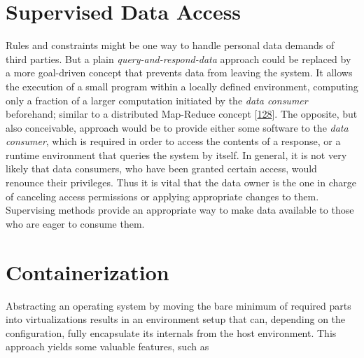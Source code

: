 \documentclass[12pt,english,a4paper,titlepage,cleardoublepage=empty,dottedtoc]{report}
\begin{document}
\hypertarget{supervised-data-access}{\section{Supervised Data
Access}\label{supervised-data-access}}

Rules and constraints might be one way to handle personal data demands
of third parties. But a plain \emph{query-and-respond-data} approach
could be replaced by a more goal-driven concept that prevents data from
leaving the system. It allows the execution of a small program within a
locally defined environment, computing only a fraction of a larger
computation initiated by the \emph{data consumer} beforehand; similar to
a distributed Map-Reduce concept
{[}\protect\hyperlink{ref-paper_2004_distributed-mapreduce}{128}{]}. The
opposite, but also conceivable, approach would be to provide either some
software to the \emph{data consumer}, which is required in order to
access the contents of a response, or a runtime environment that queries
the system by itself. In general, it is not very likely that data
consumers, who have been granted certain access, would renounce their
privileges. Thus it is vital that the data owner is the one in charge of
canceling access permissions or applying appropriate changes to them.
Supervising methods provide an appropriate way to make data available to
those who are eager to consume them.

\section{Containerization}\label{containerization}

Abstracting an operating system by moving the bare minimum of required
parts into virtualizations results in an environment setup that can,
depending on the configuration, fully encapsulate its internals from the
host environment. This approach yields some valuable features, such as
\end{document}
